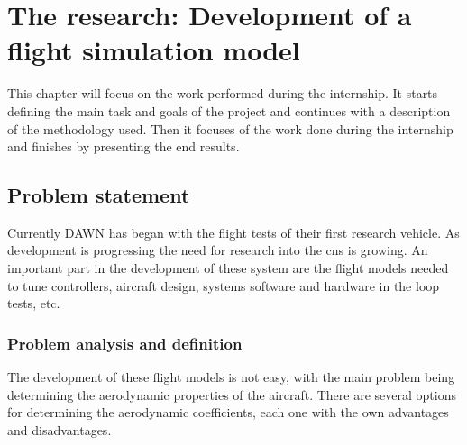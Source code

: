 \chapter{The research: Development of a flight simulation model}

This chapter will focus on the work performed during the internship. It starts defining the main task and goals of the project and continues with a description of the methodology used. Then it focuses of the work done during the internship and finishes by presenting the end results.

\section{Problem statement}
Currently DAWN has began with the flight tests of their first research vehicle. As development is progressing the need for research into the \gls{cns} is growing. An important part in the development of these system are the flight models needed to tune controllers, aircraft design, systems software and hardware in the loop tests, etc. 

\subsection{Problem analysis and definition}
The development of these flight models is not easy, with the main problem being determining the aerodynamic properties of the aircraft. There are several options for determining the aerodynamic coefficients, each one with the own advantages and disadvantages.

